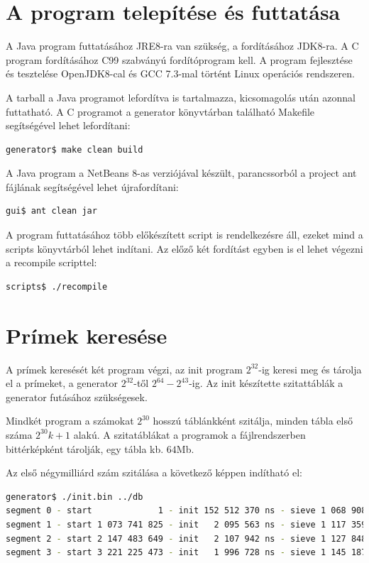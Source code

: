 \documentclass[12pt]{report}
\begin{document}
\section{A program telepítése és futtatása}

A Java program futtatásához JRE8-ra van szükség,
a fordításához JDK8-ra. A C program fordításához C99
szabványú fordítóprogram kell. A program fejlesztése
és tesztelése OpenJDK8-cal és GCC 7.3-mal történt
Linux operációs rendszeren.

A tarball a Java programot lefordítva is tartalmazza,
kicsomagolás után azonnal futtatható.
A C programot a generator könyvtárban található Makefile segítségével lehet lefordítani:
\begin{lstlisting}[language=bash]
generator$ make clean build
\end{lstlisting}

A Java program a NetBeans 8-as verziójával készült,
parancssorból a project ant fájlának segítségével lehet
újrafordítani:
\begin{lstlisting}[language=bash]
gui$ ant clean jar
\end{lstlisting}

A program futtatásához több előkészített script is rendelkezésre áll,
ezeket mind a scripts könyvtárból lehet indítani.
Az előző két fordítást egyben is el lehet végezni a recompile scripttel:
\begin{lstlisting}[language=bash]
scripts$ ./recompile
\end{lstlisting}

\section{Prímek keresése}

A prímek keresését két program végzi, az init program
$2^{32}$-ig keresi meg és tárolja el a prímeket,
a generator $2^{32}$-től $2^{64}-2^{43}$-ig.
Az init készítette szitattáblák a generator futásához szükségesek.

Mindkét program a számokat $2^{30}$ hosszú táblánkként szitálja,
minden tábla első száma $2^{30}k+1$ alakú. A szitatáblákat a programok a
fájlrendszerben bittérképként tárolják, egy tábla kb. $64$Mb.

Az első négymilliárd szám szitálása a következő képpen indítható el:

\tiny
\begin{lstlisting}[language=bash]
generator$ ./init.bin ../db
segment 0 - start             1 - init 152 512 370 ns - sieve 1 068 908 595 ns
segment 1 - start 1 073 741 825 - init   2 095 563 ns - sieve 1 117 359 702 ns
segment 2 - start 2 147 483 649 - init   2 107 942 ns - sieve 1 127 848 722 ns
segment 3 - start 3 221 225 473 - init   1 996 728 ns - sieve 1 145 187 514 ns
\end{lstlisting}
\small
\end{document}
